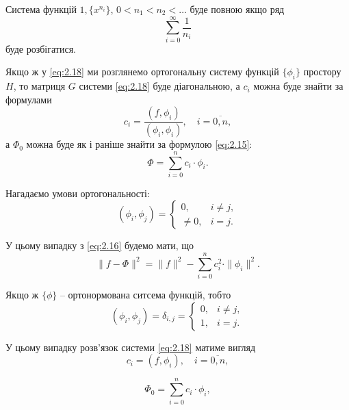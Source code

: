 \begin{theorem}[Мюнца]
	Система функцій $1, \{x^{n_i}\}$, $0 < n_1 < n_2 < \ldots $ буде повною якщо ряд
	\begin{equation*}
		\sum_{i=0}^\infty \frac{1}{n_i}
	\end{equation*}
	буде розбігатися.
\end{theorem}

Якщо ж у \eqref{eq:2.18} ми розглянемо ортогональну систему функцій $\{\phi_i\}$ простору $H$, то матриця $G$ системи \eqref{eq:2.18} буде діагональною, а $c_i$ можна буде знайти за формулами
\begin{equation}
	\label{eq:2.20}
	c_i = \frac{(f, \phi_i)}{(\phi_i, \phi_i)}, \quad i = \overline{0, n},
\end{equation}
а $\Phi_0$ можна буде як і раніше знайти за формулою \eqref{eq:2.15}:
\begin{equation*}
	\Phi = \sum_{i = 0}^n c_i \cdot \phi_i.
\end{equation*}

Нагадаємо умови ортогональності:
\begin{equation*}
	(\phi_i, \phi_j) = \begin{cases} 0, & i \ne j, \\ \ne 0, & i = j. \end{cases}
\end{equation*}

У цьому випадку з \eqref{eq:2.16} будемо мати, що
\begin{equation}
	\label{eq:21}
	\| f - \Phi\|^2 = \|f\|^2 - \sum_{i = 0}^n c_i^2 \cdot \|\phi_i\|^2.
\end{equation}

Якщо ж $\{\phi\}$ -- ортонормована ситсема функцій, тобто
\begin{equation*}
	(\phi_i, \phi_j) = \delta_{i, j} = \begin{cases} 0, & i \ne j, \\ 1, & i = j. \end{cases}
\end{equation*}

У цьому випадку розв'язок системи \eqref{eq:2.18} матиме вигляд
\begin{equation}
	\label{eq:2.22}
	c_i = (f, \phi_i), \quad i = \overline{0, n},
\end{equation}

\begin{equation}
	\label{eq:2.23}
	\Phi_0 = \sum_{i = 0}^n c_i \cdot \phi_i,
\end{equation}

